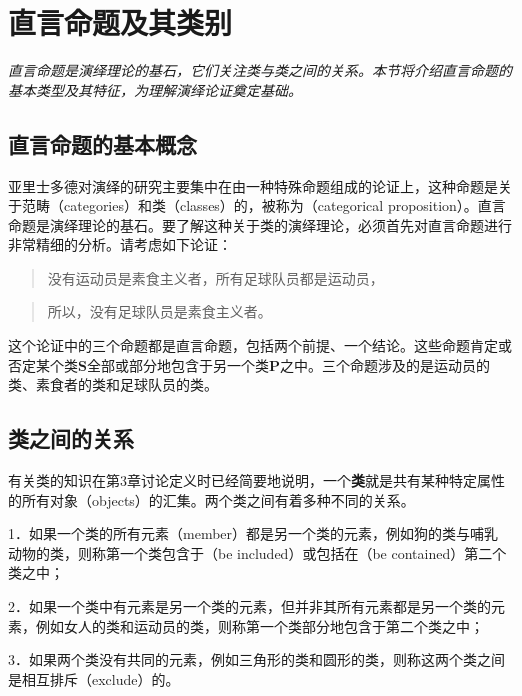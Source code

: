 \section{直言命题及其类别}

\begin{logicbox}[title=引言]
\textit{直言命题是演绎理论的基石，它们关注类与类之间的关系。本节将介绍直言命题的基本类型及其特征，为理解演绎论证奠定基础。}
\end{logicbox}

\subsection{直言命题的基本概念}

亚里士多德对演绎的研究主要集中在由一种特殊命题组成的论证上，这种命题是关于范畴（categories）和类（classes）的，被称为（categorical proposition）。直言命题是演绎理论的基石。要了解这种关于类的演绎理论，必须首先对直言命题进行非常精细的分析。请考虑如下论证：

\begin{quote}
没有运动员是素食主义者，所有足球队员都是运动员，
\end{quote}

\begin{quote}
所以，没有足球队员是素食主义者。
\end{quote}

这个论证中的三个命题都是直言命题，包括两个前提、一个结论。这些命题肯定或否定某个类$\boldsymbol{S}$全部或部分地包含于另一个类$\boldsymbol{P}$之中。三个命题涉及的是运动员的类、素食者的类和足球队员的类。

\subsection{类之间的关系}

有关类的知识在第3章讨论定义时已经简要地说明，一个\textbf{类}就是共有某种特定属性的所有对象（objects）的汇集。两个类之间有着多种不同的关系。

1．如果一个类的所有元素（member）都是另一个类的元素，例如狗的类与哺乳动物的类，则称第一个类包含于（be included）或包括在（be contained）第二个类之中；

2．如果一个类中有元素是另一个类的元素，但并非其所有元素都是另一个类的元素，例如女人的类和运动员的类，则称第一个类部分地包含于第二个类之中；

3．如果两个类没有共同的元素，例如三角形的类和圆形的类，则称这两个类之间是相互排斥（exclude）的。


